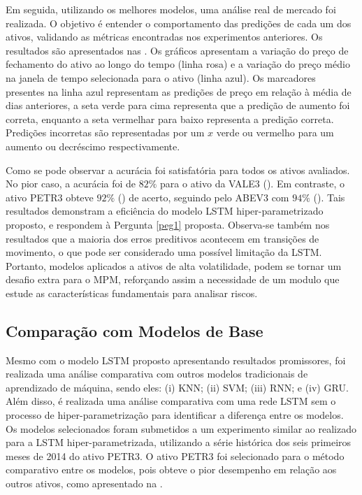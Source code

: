 Em seguida, utilizando os melhores modelos, uma análise real de mercado foi realizada. O objetivo é entender o comportamento das predições de cada um dos ativos, validando as métricas encontradas nos experimentos anteriores. Os resultados são apresentados nas . Os gráficos apresentam a variação do preço de fechamento do ativo ao longo do tempo (linha rosa) e a variação do preço médio na janela de tempo selecionada para o ativo (linha azul). Os marcadores presentes na linha azul representam as predições de preço em relação à média de dias anteriores, a seta verde para cima representa que a predição de aumento foi correta, enquanto a seta vermelhar para baixo representa a predição correta. Predições incorretas são representadas por um $x$ verde ou vermelho para um aumento ou decréscimo respectivamente.

%
%
%

Como se pode observar a acurácia foi satisfatória para todos os ativos avaliados. No pior caso, a acurácia foi de $82\%$ para o ativo da VALE3 (). Em contraste, o ativo PETR3 obteve $92\%$ () de acerto, seguindo pelo ABEV3 com $94\%$ (). Tais resultados demonstram a eficiência do modelo \acrshort{LSTM} hiper-parametrizado proposto, e respondem à Pergunta \ref{peg1} proposta. Observa-se também nos resultados que a maioria dos erros preditivos acontecem em transições de movimento, o que pode ser considerado uma possível limitação da \acrshort{LSTM}. Portanto, modelos aplicados a ativos de alta volatilidade, podem se tornar um desafio extra para o \acrshort{MPM}, reforçando assim a necessidade de um modulo que estude as características fundamentais para analisar riscos.


\subsection{Comparação com Modelos de Base}
\label{exp:base}

Mesmo com o modelo \acrshort{LSTM} proposto apresentando resultados promissores, foi realizada uma análise comparativa com outros modelos tradicionais de aprendizado de máquina, sendo eles: (i) \acrshort{KNN}; (ii) \acrshort{SVM}; (iii) \acrshort{RNN}; e (iv) \acrshort{GRU}. Além disso, é realizada uma análise comparativa com uma rede \acrshort{LSTM} sem o processo de hiper-parametrização para identificar a diferença entre os modelos. Os modelos selecionados foram submetidos a um experimento similar ao realizado para a \acrshort{LSTM} hiper-parametrizada, utilizando a série histórica dos seis primeiros meses de 2014 do ativo PETR3. O ativo PETR3 foi selecionado para o método comparativo entre os modelos, pois obteve o pior desempenho em relação aos outros ativos, como apresentado na .

